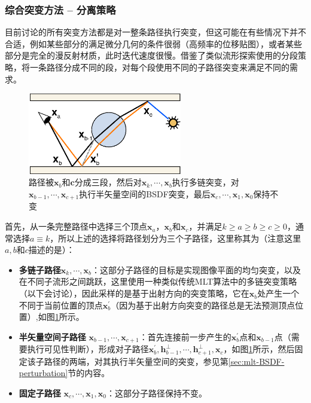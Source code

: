 \subsubsection{综合突变方法 -- 分离策略}
目前讨论的所有突变方法都是对一整条路径执行突变，但这可能在有些情况下并不合适，例如某些部分的满足微分几何的条件很弱（高频率的位移贴图），或者某些部分是完全的漫反射材质，此时迭代速度很慢。\cite{a:ImprovedHalfVectorSpaceLightTransport}借鉴了类似流形探索使用的分段策略，将一条路径分成不同的段，对每个段使用不同的子路径突变来满足不同的需求。

\begin{figure}
	\sidecaption
	\includegraphics[width=0.6\textwidth]{figures/mlt/breakup}
	\caption{路径被$\mathbf{x}_b$和$\mathbf{c}$分成三段，然后对$\mathbf{x}_k,\cdots,\mathbf{x}_b$执行多链突变，对$\mathbf{x}_{b-1},\cdots,\mathbf{x}_{c+1}$执行半矢量空间的BSDF突变，最后$\mathbf{x}_c,\cdots,\mathbf{x}_1,\mathbf{x}_0$保持不变}
	\label{f:mlt-breakup}
\end{figure}

首先，从一条完整路径中选择三个顶点$\mathbf{x}_a$，$\mathbf{x}_b$和$\mathbf{x}_c$，并满足$k\geq a\geq b\geq c\geq 0$，通常选择$a\equiv k$，所以上述的选择将路径划分为三个子路径，这里称其为（注意这里$a,b$和$c$描述的是）：

\begin{itemize}
	\item \textbf{多链子路径}$\mathbf{x}_k,\cdots,\mathbf{x}_b$：这部分子路径的目标是实现图像平面的均匀突变，以及在不同子流形之间跳跃，这里使用一种类似传统MLT算法中的多链突变策略（以下会讨论），因此采样的是基于出射方向的突变策略，它在$\mathbf{x}_b$处产生一个不同于当前位置的顶点$\mathbf{x}^{'}_b$（因为基于出射方向突变的路径总是无法预测顶点位置）,如图\ref{f:mlt-breakup}所示。
	\item \textbf{半矢量空间子路径 }$\mathbf{x}_{b-1},\cdots,\mathbf{x}_{c+1}$：首先连接前一步产生的$\mathbf{x}^{'}_b$点和$\mathbf{x}_{b-1}$点（需要执行可见性判断），形成对子路径$\mathbf{x}^{'}_b,\mathbf{h}^{\perp}_{b-1},\cdots,\mathbf{h}^{\perp}_{c+1},\mathbf{x}_c$，如图\ref{f:mlt-breakup}所示，然后固定该子路径的两端，对其执行半矢量空间的突变，参见第\ref{sec:mlt-BSDF-perturbation}节的内容。
	\item \textbf{固定子路径 }$\mathbf{x}_c,\cdots,\mathbf{x}_1,\mathbf{x}_0$：这部分子路径保持不变。
\end{itemize}

